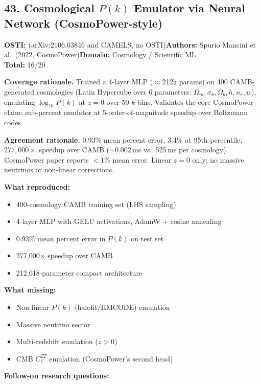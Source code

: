 \subsection{43. Cosmological $P(k)$ Emulator via Neural Network (CosmoPower-style)}
\textbf{OSTI:} (arXiv:2106.03846 and CAMELS, no OSTI)\quad\textbf{Authors:} Spurio Mancini et al.\ (2022, CosmoPower)\quad\textbf{Domain:} Cosmology / Scientific ML\\
\quad{}\quad\textbf{Total:} 16/20\par\smallskip
\noindent\textbf{Coverage rationale.} Trained a 4-layer MLP ($\approx$212k params) on 400 CAMB-generated cosmologies (Latin Hypercube over 6 parameters: $\Omega_m, \sigma_8, \Omega_b, h, n_s, w$), emulating $\log_{10} P(k)$ at $z=0$ over 50 $k$-bins. Validates the core CosmoPower claim: sub-percent emulator at 5-order-of-magnitude speedup over Boltzmann codes.\par
\noindent\textbf{Agreement rationale.} 0.93\% mean percent error, 3.4\% at 95th percentile, $277,\!000\times$ speedup over CAMB ($\sim$0.002\,ms vs.\ 525\,ms per cosmology). CosmoPower paper reports $<1\%$ mean error. Linear $z=0$ only; no massive neutrinos or non-linear corrections.\par\smallskip
\noindent\textbf{What reproduced:}
\begin{itemize}[leftmargin=1.4em,itemsep=0.2em,topsep=0.2em]
\item 400-cosmology CAMB training set (LHS sampling)
\item 4-layer MLP with GELU activations, AdamW + cosine annealing
\item 0.93\% mean percent error in $P(k)$ on test set
\item 277,000$\times$ speedup over CAMB
\item 212,018-parameter compact architecture
\end{itemize}
\noindent\textbf{What missing:}
\begin{itemize}[leftmargin=1.4em,itemsep=0.2em,topsep=0.2em]
\item Non-linear $P(k)$ (halofit/HMCODE) emulation
\item Massive neutrino sector
\item Multi-redshift emulation ($z>0$)
\item CMB $C_\ell^{TT}$ emulation (CosmoPower's second head)
\end{itemize}
\noindent\textbf{Follow-on research questions:}
